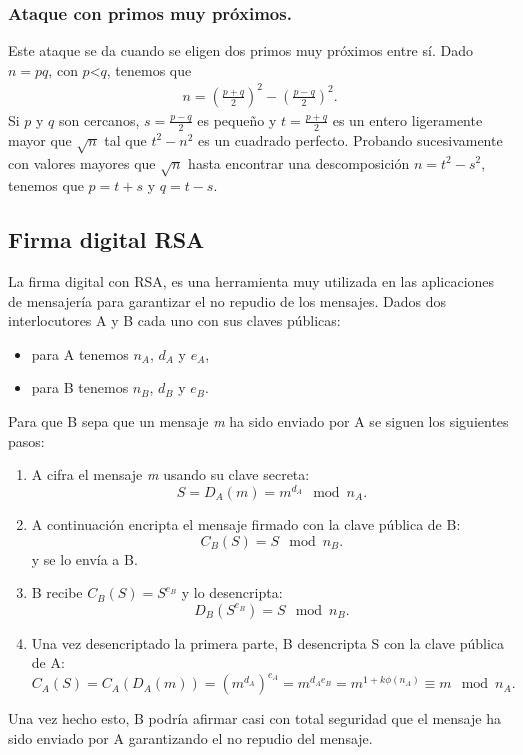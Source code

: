 	\subsubsection{Ataque con primos muy próximos.}
	Este ataque se da cuando se eligen dos primos muy próximos entre sí. Dado $n=pq$, con $p$\textless $q$, tenemos que  
	\begin{align*}
			n=\left (\frac{p+q}{2}\right )^2-\left (\frac{p-q}{2}\right )^2.
	\end{align*}
	Si $p$ y $q$ son cercanos, $s=\frac{p-q}{2}$ es pequeño y $t=\frac{p+q}{2}$ es un entero ligeramente mayor que $\sqrt{n}$ tal que $t^2 - n^2$ es un cuadrado perfecto. Probando sucesivamente con valores mayores que $\sqrt{n}$ hasta encontrar una descomposición $n=t^2-s^2$, tenemos que $p=t+s$ y $q=t-s$.

\subsection{Firma digital RSA}
La firma digital con RSA, es una herramienta muy utilizada en las aplicaciones de mensajería para garantizar el no repudio de los mensajes.
Dados dos interlocutores A y B cada uno con sus claves públicas:
\begin{itemize}
	\item para A tenemos $n_A$, $d_A$ y $e_A$,  
	\item para B tenemos $n_B$, $d_B$ y $e_B$.  
\end{itemize}
Para que B sepa que un mensaje \emph{m} ha sido enviado por A se siguen los siguientes pasos:
\begin{enumerate}
	\item A cifra el mensaje \emph{m} usando su clave secreta:
		$$
			S=D_A(m)=m^{d_A} \mod n_A.
		$$
	\item A continuación encripta el mensaje firmado con la clave pública de B:
		$$
			C_B(S)=S\mod n_B.
		$$
		y se lo envía a B.
	\item B recibe $C_B(S)=S^{e_B}$ y lo desencripta: 
		$$
			D_B(S^{e_B})=S \mod n_B.
		$$
	\item Una vez desencriptado la primera parte, B desencripta S con la clave pública de A:
		$$
			C_A(S)=C_A(D_A(m))=(m^{d_A})^{e_A}=m^{d_Ae_B}=m^{1+k\phi(n_A)}\equiv m \mod n_A.
		$$
\end{enumerate}
Una vez hecho esto, B podría afirmar casi con total seguridad que el mensaje ha sido enviado por A garantizando el no repudio del mensaje.

